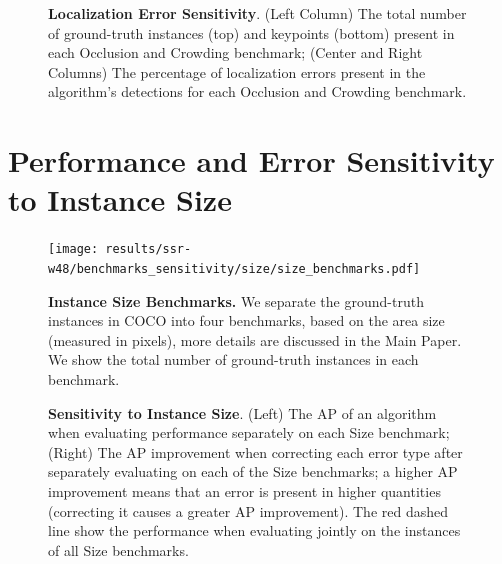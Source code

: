 \documentclass[10pt,onecolumn,letterpaper]{article}
\begin{document}
\begin{figure}[h!]
\centering
{}
\caption{ {\small \textbf{Localization Error Sensitivity}. (Left Column) The total number of ground-truth instances (top) and keypoints (bottom) present
 in each Occlusion and Crowding benchmark; (Center and Right Columns) The percentage of localization errors present in the algorithm's detections for each Occlusion and Crowding benchmark.}}
\end{figure}
\clearpage

\section{Performance and Error Sensitivity to Instance Size}

\begin{figure}[h!]
\centering
\texttt{[image: results/ssr-w48/benchmarks\_sensitivity/size/size\_benchmarks.pdf]}
\caption{ {\small \textbf{Instance Size Benchmarks.} We separate the ground-truth instances in COCO into four benchmarks, based on the area size (measured in pixels),
more details are discussed in the Main Paper. We show the total number of ground-truth instances in each benchmark.}}
\end{figure}

\begin{figure}[h!]
\centering
{}
\caption{ {\small \textbf{Sensitivity to Instance Size}.
(Left) The AP of an algorithm when evaluating performance separately on each Size benchmark;
(Right) The AP improvement when correcting each error type after separately evaluating on each of the Size benchmarks;
a higher AP improvement means that an error is present in higher quantities (correcting it causes a greater AP improvement).
The red dashed line show the performance when evaluating jointly on the instances of all Size benchmarks.}}
\end{figure}
\end{document}
